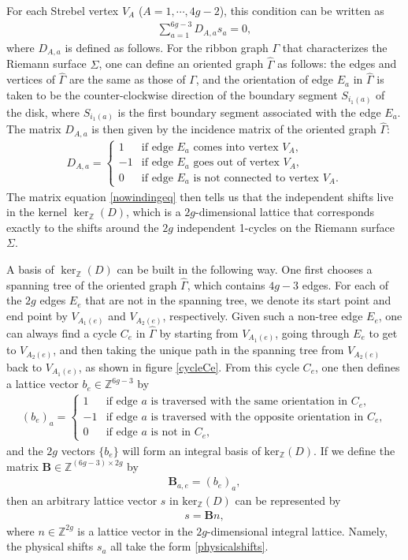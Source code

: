 \documentclass[12pt]{article}
\def\ie{\begin{equation}\begin{aligned}}
\def\fe{\end{aligned}\end{equation}}
\numberwithin{equation}{section}
\begin{document}
For each Strebel vertex $V_A$ ($A=1,\cdots, 4g-2$), this condition can be written as
\ie \label{nowindingeq}
\sum_{a=1}^{6g-3} D_{A,a}s_a = 0,
\fe
where $D_{A,a}$ is defined as follows. For the ribbon graph $\Gamma$ that characterizes the Riemann surface $\Sigma$, one can define an oriented graph $\hat{\Gamma}$ as follows: the edges and vertices of $\hat{\Gamma}$ are the same as those of $\Gamma$, and the orientation of edge $E_a$ in $\hat{\Gamma}$ is taken to be the counter-clockwise direction of the boundary segment $S_{i_1(a)}$ of the disk, where $S_{i_1(a)}$ is the first boundary segment associated with the edge $E_a$. The matrix $D_{A,a}$ is then given by the incidence matrix of the oriented graph $\hat{\Gamma}$:
\ie
D_{A,a}=\begin{cases}
 1 & \text{if edge } E_a \text{ comes into vertex } V_A,\\
 -1 & \text{if edge } E_a \text{ goes out of vertex } V_A, \\
 0 & \text{if edge } E_a \text{ is not connected to vertex }V_A.
\end{cases}
\fe
The matrix equation \eqref{nowindingeq} then tells us that the independent shifts live in the kernel $\operatorname{ker}_{\mathbb{Z}}(D)$, which is a $2g$-dimensional lattice that corresponds exactly to the shifts around the $2g$ independent 1-cycles on the Riemann surface $\Sigma$.

A basis of $\operatorname{ker}_{\mathbb{Z}}(D)$ can be built in the following way. One first chooses a spanning tree of the oriented graph $\hat{\Gamma}$, which contains $4g-3$ edges. For each of the $2g$ edges $E_e$ that are not in the spanning tree, we denote its start point and end point by $V_{A_1(e)}$ and $V_{A_2(e)}$, respectively. Given such a non-tree edge $E_e$, one can always find a cycle $C_e$ in $\hat{\Gamma}$ by starting from $V_{A_1(e)}$, going through $E_e$ to get to $V_{A_2(e)}$, and then taking the unique path in the spanning tree from $V_{A_2(e)}$ back to $V_{A_1(e)}$, as shown in figure \ref{cycleCe}. From this cycle $C_e$, one then defines a lattice vector $b_e\in \mathbb{Z}^{6g-3}$ by
\ie
(b_e)_a=\begin{cases}
 1 & \text{if edge } a \text{ is traversed with the same orientation in } C_e,\\
 -1 & \text{if edge } a \text{ is traversed with the opposite orientation in } C_e,\\
 0 & \text{if edge } a \text{ is not in } C_e,
\end{cases}
\fe
and the $2g$ vectors $\{b_e\}$ will form an integral basis of $\text{ker}_{\mathbb{Z}}(D)$. If we define the matrix $\mathbf{B}\in \mathbb{Z}^{(6g-3)\times 2g}$ by 
\ie \label{Bmatrix}
\mathbf{B}_{a,e}=(b_e)_a,
\fe 
then an arbitrary lattice vector $s$ in $\text{ker}_{\mathbb{Z}}(D)$ can be represented by 
\ie \label{physicalshifts} s=\mathbf{B}n,\fe
where $n\in \mathbb{Z}^{2g}$ is a lattice vector in the $2g$-dimensional integral lattice. Namely, the physical shifts $s_a$ all take the form \eqref{physicalshifts}.
\end{document}
